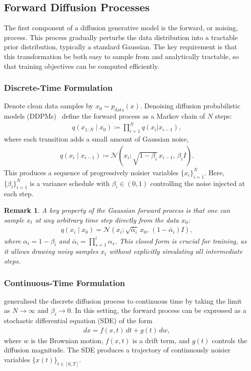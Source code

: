 \documentclass[a4paper,12pt]{article}
\newtheorem{remark}{Remark}[section]
\begin{document}
\subsection{Forward Diffusion Processes}
The first component of a diffusion generative model is the forward, or noising, process. 
This process gradually perturbs the data distribution into a tractable prior distribution, typically a standard Gaussian. The key requirement is that this transformation be both easy to sample from and analytically tractable, so that training objectives can be computed efficiently.

\subsubsection{Discrete-Time Formulation}
Denote clean data samples by \(x_0 \sim p_{\text{data}}(x)\). Denoising diffusion probabilistic models (DDPMs)~\citep{hoDenoisingDiffusionProbabilistic2020} define the forward process as a Markov chain of \(N\) steps:
\begin{align*}
    q\left(x_{1:N}\mid x_0\right)\coloneq\prod_{i=1}^{N}q\left(x_i|x_{i-1}\right),
\end{align*}
where each transition adds a small amount of Gaussian noise,
\begin{align}\label{eq:DDPM-transition-kernel}
    q\left(x_i \mid x_{i-1}\right)\coloneq\mathcal{N}\!\left(x_i ; \sqrt{1-\beta_i}\,x_{i-1}, \, \beta_i I \right).
\end{align}
This produces a sequence of progressively noisier variables \(\{x_i\}_{i=1}^N\). Here, \(\{\beta_i\}_{i=1}^N\) is a variance schedule with \(\beta_i \in (0,1)\) controlling the noise injected at each step.
\begin{remark}
    A key property of the Gaussian forward process is that one can sample \(x_t\) at any arbitrary time step directly from the data \(x_0\):
    \begin{align*}
        q\left(x_i \mid x_0\right) = \mathcal{N}\!\left(x_i ; \sqrt{\bar \alpha_i}\,x_0, \,(1-\bar \alpha_i) I \right),
    \end{align*}
    where \(\alpha_i = 1 - \beta_i\) and \(\bar \alpha_i = \prod_{s=1}^i \alpha_s\). This closed form is crucial for training, as it allows drawing noisy samples \(x_t\) without explicitly simulating all intermediate steps.
\end{remark}

\subsubsection{Continuous-Time Formulation}
\citet{song2021ScoreBasedGenerativeModeling} generalised the discrete diffusion process to continuous time by taking the limit as \(N \to \infty\) and \(\beta_i \to 0\). In this setting, the forward process can be expressed as a stochastic differential equation (SDE) of the form
\begin{align}\label{eq:forward_sde}
    dx = f(x,t)\,dt + g(t)\,dw,
\end{align}
where \(w\) is the Brownian motion, \(f(x,t)\) is a drift term, and \(g(t)\) controls the diffusion magnitude. The SDE produces a trajectory of continuously noisier variables \(\{x(t)\}_{t \in [0,T]}\).
\end{document}
